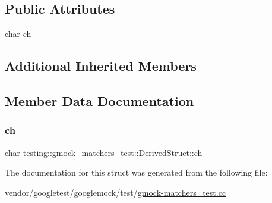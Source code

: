 \subsection*{Public Attributes}
\begin{DoxyCompactItemize}
\item 
char \hyperlink{structtesting_1_1gmock__matchers__test_1_1_derived_struct_abd7de960817b2c889f109ae6f2869f4c}{ch}
\end{DoxyCompactItemize}
\subsection*{Additional Inherited Members}


\subsection{Member Data Documentation}
\mbox{\label{structtesting_1_1gmock__matchers__test_1_1_derived_struct_abd7de960817b2c889f109ae6f2869f4c}} 
\subsubsection{\texorpdfstring{ch}{ch}}
{\footnotesize\ttfamily char testing\+::gmock\+\_\+matchers\+\_\+test\+::\+Derived\+Struct\+::ch}



The documentation for this struct was generated from the following file\+:\begin{DoxyCompactItemize}
\item 
vendor/googletest/googlemock/test/\hyperlink{gmock-matchers__test_8cc}{gmock-\/matchers\+\_\+test.\+cc}\end{DoxyCompactItemize}
